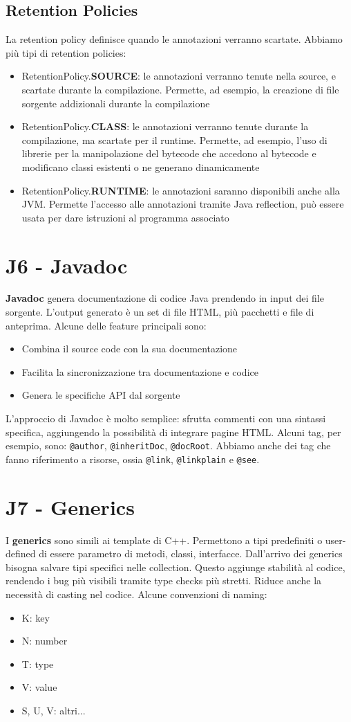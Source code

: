 \documentclass[11pt]{article}
\newcommand{\code}[1]{\texttt{#1}}
\begin{document}
\subsection{Retention Policies}
La retention policy definisce quando le annotazioni verranno scartate. Abbiamo più tipi di retention policies:
\begin{itemize}
    \item RetentionPolicy.\textbf{SOURCE}: le annotazioni verranno tenute nella source, e scartate durante la compilazione. Permette, ad esempio, la creazione di file sorgente addizionali durante la compilazione
    \item RetentionPolicy.\textbf{CLASS}: le annotazioni verranno tenute durante la compilazione, ma scartate per il runtime. Permette, ad esempio, l'uso di librerie per la manipolazione del bytecode che accedono al bytecode e modificano classi esistenti o ne generano dinamicamente
    \item RetentionPolicy.\textbf{RUNTIME}: le annotazioni saranno disponibili anche alla JVM. Permette l'accesso alle annotazioni tramite Java reflection, può essere usata per dare istruzioni al programma associato
\end{itemize}
\section{J6 - Javadoc}
\textbf{Javadoc} genera documentazione di codice Java prendendo in input dei file sorgente. L'output generato è un set di file HTML, più pacchetti e file di anteprima. 
Alcune delle feature principali sono:
\begin{itemize}
    \item Combina il source code con la sua documentazione
    \item Facilita la sincronizzazione tra documentazione e codice
    \item Genera le specifiche API dal sorgente
\end{itemize}
L'approccio di Javadoc è molto semplice: sfrutta commenti con una sintassi specifica, aggiungendo la possibilità di integrare pagine HTML. 
Alcuni tag, per esempio, sono: \code{@author}, \code{@inheritDoc}, \code{@docRoot}. Abbiamo anche dei tag che fanno riferimento a risorse, ossia \code{@link}, \code{@linkplain} e \code{@see}.
\section{J7 - Generics}
I \textbf{generics} sono simili ai template di C++. Permettono a tipi predefiniti o user-defined di essere parametro di metodi, classi, interfacce. Dall'arrivo dei generics bisogna salvare tipi specifici nelle collection. Questo aggiunge stabilità al codice, rendendo i bug più visibili tramite type checks più stretti. Riduce anche la necessità di casting nel codice. Alcune convenzioni di naming:
\begin{itemize}
    \item K: key
    \item N: number 
    \item T: type
    \item V: value
    \item S, U, V: altri...
\end{itemize}
\end{document}
